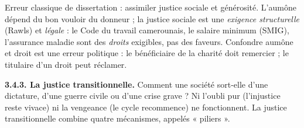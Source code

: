 \documentclass[11pt]{article}
\newcommand{\cle}[1]{{\popxbold\color{popdark}#1}}
\begin{document}
\begin{attention}
Erreur classique de dissertation : assimiler justice sociale et générosité. L'aumône dépend du bon vouloir du donneur ; la justice sociale est une \emph{exigence structurelle} (Rawls) et \emph{légale} : le Code du travail camerounais, le salaire minimum (SMIG), l'assurance maladie sont des \emph{droits} exigibles, pas des faveurs. Confondre aumône et droit est une erreur politique : le bénéficiaire de la charité doit remercier ; le titulaire d'un droit peut réclamer.
\end{attention}

\textbf{3.4.3. La justice transitionnelle.} Comment une société sort-elle d'une dictature, d'une guerre civile ou d'une crise grave ? Ni l'oubli pur (l'injustice reste vivace) ni la vengeance (le cycle recommence) ne fonctionnent. La \cle{justice transitionnelle} combine quatre mécanismes, appelés « piliers ».
\end{document}
